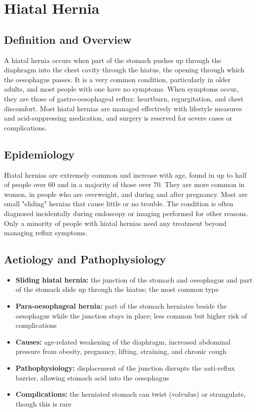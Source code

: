 \chapter{Hiatal Hernia}

\section*{Definition and Overview}
A hiatal hernia occurs when part of the stomach pushes up through the diaphragm into the chest cavity through the hiatus, the opening through which the oesophagus passes. It is a very common condition, particularly in older adults, and most people with one have no symptoms. When symptoms occur, they are those of gastro-oesophageal reflux: heartburn, regurgitation, and chest discomfort. Most hiatal hernias are managed effectively with lifestyle measures and acid-suppressing medication, and surgery is reserved for severe cases or complications.

\section*{Epidemiology}
Hiatal hernias are extremely common and increase with age, found in up to half of people over 60 and in a majority of those over 70. They are more common in women, in people who are overweight, and during and after pregnancy. Most are small "sliding" hernias that cause little or no trouble. The condition is often diagnosed incidentally during endoscopy or imaging performed for other reasons. Only a minority of people with hiatal hernias need any treatment beyond managing reflux symptoms.

\section*{Aetiology and Pathophysiology}
\begin{itemize}
    \item \textbf{Sliding hiatal hernia:} the junction of the stomach and oesophagus and part of the stomach slide up through the hiatus; the most common type
    \item \textbf{Para-oesophageal hernia:} part of the stomach herniates beside the oesophagus while the junction stays in place; less common but higher risk of complications
    \item \textbf{Causes:} age-related weakening of the diaphragm, increased abdominal pressure from obesity, pregnancy, lifting, straining, and chronic cough
    \item \textbf{Pathophysiology:} displacement of the junction disrupts the anti-reflux barrier, allowing stomach acid into the oesophagus
    \item \textbf{Complications:} the herniated stomach can twist (volvulus) or strangulate, though this is rare
\end{itemize}

